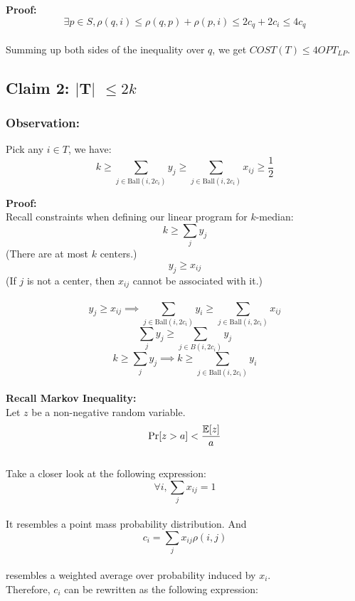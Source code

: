\noindent\textbf{Proof:} \\
$$\exists p \in S, \rho(q, i) \leq \rho(q,p)+\rho(p, i)\leq 2c_q+2c_i \leq 4c_q$$ \\

\noindent Summing up both sides of the inequality over $q$, we get $COST(T) \leq 4 OPT_{LP}$.
\subsection*{Claim 2: $\mid$T$\mid$ $\leq 2k$} 
\subsubsection*{Observation:}
\noindent Pick any $i \in T$, we have:
$$k \geq \sum_{j \in \text{Ball}(i, 2c_i)}y_j \geq \sum_{j \in \text{Ball}(i, 2c_i)}x_{ij} \geq \frac{1}{2}$$

\noindent\textbf{Proof:} \\

\noindent Recall constraints when defining our linear program for $k$-median: \\
$$ k \geq \sum\limits_{j} y_j$$ (There are at most $k$ centers.)\\
$$ y_{j} \geq x_{ij}$$ (If $j$ is not a center, then $x_{ij}$ cannot be associated with it.) \\ \\

\noindent $$ y_{j} \geq x_{ij} \implies \sum_{j \in \text{Ball}(i, 2c_i)}y_i \geq \sum_{j \in \text{Ball}(i, 2c_i)}x_{ij} $$
$$ \sum\limits_{j}y_j \geq \sum\limits_{j \in B(i, 2c_i)}y_j $$ 
$$ k \geq \sum\limits_{j} y_j \implies k \geq \sum_{j \in \text{Ball}(i, 2c_i)}y_i $$ \\
\noindent\textbf{Recall Markov Inequality:} \\

\noindent Let $z$ be a non-negative random variable. \\
$$ \Pr[z > a] < \frac{\mathbb{E}[z]}{a} $$ \\ 

\noindent Take a closer look at the following expression: \\
$$ \forall i, \sum\limits_{j}x_{ij} = 1 $$ \\
\noindent It resembles a point mass probability distribution. And \\

\noindent $$ c_i = \sum\limits_{j}x_{ij}\rho(i,j) $$ \\
\noindent resembles a weighted average over probability induced by $x_i$.  \\ Therefore, $c_i$ can be rewritten as the following expression: \\

